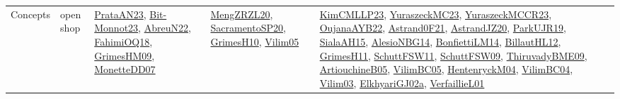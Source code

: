 {\begin{longtable}{lp{3cm}>{\raggedright}p{6cm}>{\raggedright}p{6cm}p{8cm}}
Concepts & open shop & \href{articles/PrataAN23.pdf}{PrataAN23}\cite{PrataAN23}, \href{papers/Bit-Monnot23.pdf}{Bit-Monnot23}\cite{Bit-Monnot23}, \href{articles/AbreuN22.pdf}{AbreuN22}\cite{AbreuN22}, \href{articles/FahimiOQ18.pdf}{FahimiOQ18}\cite{FahimiOQ18}, \href{papers/GrimesHM09.pdf}{GrimesHM09}\cite{GrimesHM09}, \href{papers/MonetteDD07.pdf}{MonetteDD07}\cite{MonetteDD07} & \href{articles/MengZRZL20.pdf}{MengZRZL20}\cite{MengZRZL20}, \href{articles/SacramentoSP20.pdf}{SacramentoSP20}\cite{SacramentoSP20}, \href{papers/GrimesH10.pdf}{GrimesH10}\cite{GrimesH10}, \href{papers/Vilim05.pdf}{Vilim05}\cite{Vilim05} & \href{papers/KimCMLLP23.pdf}{KimCMLLP23}\cite{KimCMLLP23}, \href{papers/YuraszeckMC23.pdf}{YuraszeckMC23}\cite{YuraszeckMC23}, \href{articles/YuraszeckMCCR23.pdf}{YuraszeckMCCR23}\cite{YuraszeckMCCR23}, \href{papers/OujanaAYB22.pdf}{OujanaAYB22}\cite{OujanaAYB22}, \href{papers/Astrand0F21.pdf}{Astrand0F21}\cite{Astrand0F21}, \href{articles/AstrandJZ20.pdf}{AstrandJZ20}\cite{AstrandJZ20}, \href{papers/ParkUJR19.pdf}{ParkUJR19}\cite{ParkUJR19}, \href{papers/SialaAH15.pdf}{SialaAH15}\cite{SialaAH15}, \href{papers/AlesioNBG14.pdf}{AlesioNBG14}\cite{AlesioNBG14}, \href{papers/BonfiettiLM14.pdf}{BonfiettiLM14}\cite{BonfiettiLM14}, \href{papers/BillautHL12.pdf}{BillautHL12}\cite{BillautHL12}, \href{papers/GrimesH11.pdf}{GrimesH11}\cite{GrimesH11}, \href{articles/SchuttFSW11.pdf}{SchuttFSW11}\cite{SchuttFSW11}, \href{papers/SchuttFSW09.pdf}{SchuttFSW09}\cite{SchuttFSW09}, \href{papers/ThiruvadyBME09.pdf}{ThiruvadyBME09}\cite{ThiruvadyBME09}, \href{papers/ArtiouchineB05.pdf}{ArtiouchineB05}\cite{ArtiouchineB05}, \href{articles/VilimBC05.pdf}{VilimBC05}\cite{VilimBC05}, \href{papers/HentenryckM04.pdf}{HentenryckM04}\cite{HentenryckM04}, \href{papers/VilimBC04.pdf}{VilimBC04}\cite{VilimBC04}, \href{papers/Vilim03.pdf}{Vilim03}\cite{Vilim03}, \href{papers/ElkhyariGJ02a.pdf}{ElkhyariGJ02a}\cite{ElkhyariGJ02a}, \href{papers/VerfaillieL01.pdf}{VerfaillieL01}\cite{VerfaillieL01}\\

\end{longtable}}
